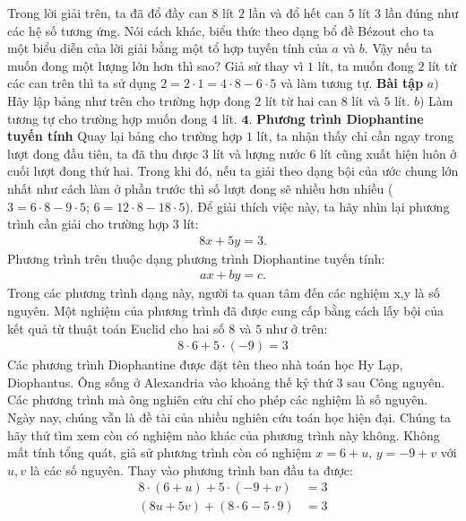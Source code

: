\begin{multicols}{2}
	Trong lời giải trên, ta đã đổ đầy can $8$ lít $2$ lần và đổ hết can $5$ lít $3$ lần đúng như các hệ số tương ứng. Nói cách khác, biểu thức theo dạng bổ đề Bézout cho ta một biểu diễn của lời giải bằng một tổ hợp tuyến tính của $a$ và $b$.
	\vskip 0.1cm
	Vậy nếu ta muốn đong một lượng lớn hơn thì sao? Giả sử thay vì $1$ lít, ta muốn đong $2$ lít từ các can trên thì ta sử dụng $2=2\cdot 1=4\cdot 8-6\cdot 5$ và làm tương tự.
	\vskip 0.1cm
	\textbf{\color{hoccungpi}Bài tập}
	\vskip 0.1cm
	$a)$ Hãy lập bảng như trên cho trường hợp đong $2$ lít từ hai can $8$ lít và $5$ lít.
	\vskip 0.1cm
	$b)$ Làm tương tự cho trường hợp muốn đong $4$ lít.
	\vskip 0.1cm
	$\pmb{4.}$ \textbf{\color{hoccungpi}Phương trình Diophantine tuyến tính}
	\vskip 0.1cm
	Quay lại bảng cho trường hợp $1$ lít, ta nhận thấy chỉ cần ngay trong lượt đong đầu tiên, ta đã thu được $3$ lít và lượng nước 6 lít cũng xuất hiện luôn ở cuối lượt đong thứ hai. Trong khi đó, nếu ta giải theo dạng bội của ước chung lớn nhất như cách làm ở phần trước thì số lượt đong sẽ nhiều hơn nhiều ($3=6\cdot 8-9\cdot 5$; $6=12\cdot 8-18\cdot 5$).
	\vskip 0.1cm
	Để giải thích việc này, ta hãy nhìn lại phương trình cần giải cho trường hợp $3$ lít:
	\begin{align*}
		8x+5y=3.	\tag{$4$}
	\end{align*}
	Phương trình trên thuộc dạng phương trình Diophantine tuyến tính: 
	\begin{align*}
		ax+by=c.
	\end{align*}
	Trong các phương trình dạng này, người ta quan tâm đến các nghiệm x,y là số nguyên. Một nghiệm của phương trình đã được cung cấp bằng cách lấy bội của kết quả từ thuật toán Euclid cho hai số $8$ và $5$ như ở trên:
	\begin{align*}
		8\cdot 6+5\cdot (-9)=3
	\end{align*}
	Các phương trình Diophantine được đặt tên theo nhà toán học Hy Lạp, Diophantus. Ông sống ở Alexandria vào khoảng thế kỷ thứ $3$ sau Công nguyên. Các phương trình mà ông nghiên cứu chỉ cho phép các nghiệm là số nguyên. Ngày nay, chúng vẫn là đề tài của nhiều nghiên cứu toán học hiện đại.
	\vskip 0.1cm
	Chúng ta hãy thử tìm xem còn có nghiệm nào khác của phương trình này không. Không mất tính tổng quát, giả sử phương trình còn có nghiệm $x=6+u$, $y=-9+v$ với $u,v$ là các số nguyên. Thay vào phương trình ban đầu ta được:
	\begin{align*}
		8\cdot (6+u)+5\cdot (-9+v)&=3\\
		(8u+5v)+(8\cdot 6-5\cdot 9)&=3\\

\end{align*}
\end{multicols}
